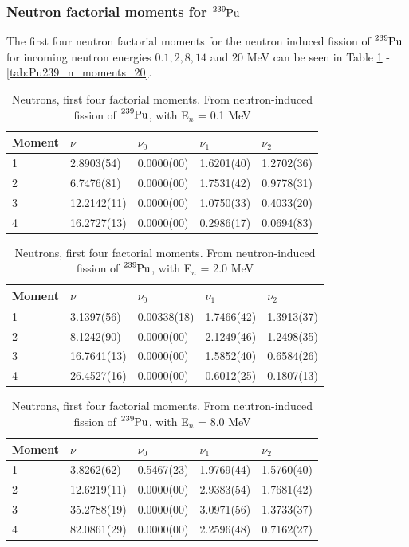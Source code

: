 \documentclass[]{article}
\begin{document}
\subsubsection{Neutron factorial moments for $\ce{^{239}Pu}$}

The first four neutron factorial moments for the neutron induced fission of $\ce{^{239}Pu}$ for incoming neutron energies $0.1, 2, 8, 14$ and $20$ MeV can be seen in Table \ref{tab:Pu239_n_moments_0_1} - \ref{tab:Pu239_n_moments_20}.

\begin{table} [H]
	\centering
	\caption{Neutrons, first four factorial moments. From neutron-induced fission of $\ce{^{239}Pu}$, with E$_n$ = 0.1 MeV }
	\begin{tabularx}{\textwidth}{XXXXX} \hline
		\label{tab:Pu239_n_moments_0_1}
		Moment & $\nu$ & $\nu_0$ & $\nu_1$ & $\nu_2$ \\ \hline
		1 & 2.8903(54) & 0.0000(00) &1.6201(40) & 1.2702(36)\\
		2 & 6.7476(81) & 0.0000(00)  & 1.7531(42) & 0.9778(31)\\
		3 & 12.2142(11) & 0.0000(00)  & 1.0750(33) & 0.4033(20)\\
		4 & 16.2727(13) & 0.0000(00)  & 0.2986(17) & 0.0694(83)\\ 
	\end{tabularx}
\end{table}

\begin{table} [H]
	\centering
	\caption{Neutrons, first four factorial moments. From neutron-induced fission of $\ce{^{239}Pu}$, with E$_n$ = 2.0 MeV }
	\begin{tabularx}{\textwidth}{XXXXX} \hline
		\label{tab:Pu239_n_moments_2}
		Moment & $\nu$ & $\nu_0$ & $\nu_1$ & $\nu_2$ \\ \hline
		1 & 3.1397(56) & 0.00338(18) & 1.7466(42) & 1.3913(37)\\
		2 & 8.1242(90) & 0.0000(00) & 2.1249(46) & 1.2498(35)\\
		3 & 16.7641(13) & 0.0000(00) & 1.5852(40) & 0.6584(26)\\
		4 & 26.4527(16) & 0.0000(00) & 0.6012(25) & 0.1807(13)\\ 
	\end{tabularx}
\end{table}

\begin{table} [H]
	\centering
	\caption{Neutrons, first four factorial moments. From neutron-induced fission of $\ce{^{239}Pu}$, with E$_n$ = 8.0 MeV }
	\begin{tabularx}{\textwidth}{XXXXX} \hline
		\label{tab:Pu239_n_moments_8}
		Moment & $\nu$ & $\nu_0$ & $\nu_1$ & $\nu_2$ \\ \hline
		1 & 3.8262(62) & 0.5467(23) & 1.9769(44) & 1.5760(40)\\
		2 & 12.6219(11) & 0.0000(00) & 2.9383(54) & 1.7681(42)\\
		3 & 35.2788(19) & 0.0000(00) & 3.0971(56) & 1.3733(37)\\
		4 & 82.0861(29) & 0.0000(00) & 2.2596(48) & 0.7162(27)\\ 
	\end{tabularx}
\end{table}
\end{document}
